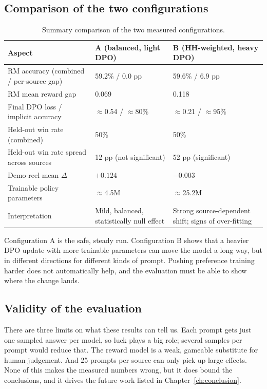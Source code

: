 \subsection{Comparison of the two configurations}
\begin{table}[!htbp]
\centering
\caption[Configuration A vs.\ B]{Summary comparison of the two measured configurations.}
\label{tab:ab-compare}
\small
\begin{tabularx}{\textwidth}{@{}L{5.6cm}YY@{}}
\toprule
\textbf{Aspect} & \textbf{A (balanced, light DPO)} & \textbf{B (HH-weighted, heavy DPO)}\\
\midrule
RM accuracy (combined / per-source gap) & 59.2\% / 0.0 pp & 59.6\% / 6.9 pp\\
RM mean reward gap & 0.069 & 0.118\\
Final DPO loss / implicit accuracy & $\approx$0.54 / $\approx$80\% & $\approx$0.21 / $\approx$95\%\\
Held-out win rate (combined) & 50\% & 50\%\\
Held-out win rate spread across sources & 12 pp (not significant) & 52 pp (significant)\\
Demo-reel mean $\Delta$ & $+0.124$ & $-0.003$\\
Trainable policy parameters & $\approx$4.5M & $\approx$25.2M\\
Interpretation & Mild, balanced, statistically null effect & Strong source-dependent shift; signs of over-fitting\\
\bottomrule
\end{tabularx}
\end{table}

Configuration A is the safe, steady run. Configuration B shows that a heavier DPO update with more trainable parameters can move the model a long way, but in different directions for different kinds of prompt. Pushing preference training harder does not automatically help, and the evaluation must be able to show where the change lands.

\subsection{Validity of the evaluation}
There are three limits on what these results can tell us. Each prompt gets just one sampled answer per model, so luck plays a big role; several samples per prompt would reduce that. The reward model is a weak, gameable substitute for human judgement. And 25 prompts per source can only pick up large effects. None of this makes the measured numbers wrong, but it does bound the conclusions, and it drives the future work listed in Chapter~\ref{ch:conclusion}.

